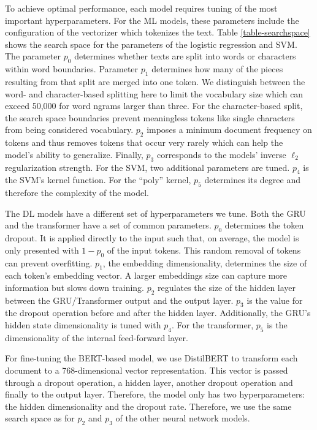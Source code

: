 

To achieve optimal performance, each model requires tuning of the most important hyperparameters. For the ML models, these parameters include the configuration of the vectorizer which tokenizes the text. Table \ref{table-searchspace} shows the search space for the parameters of the logistic regression and SVM. The parameter $p_0$ determines whether texts are split into words or characters within word boundaries. Parameter $p_1$ determines how many of the pieces resulting from that split are merged into one token. We distinguish between the word- and character-based splitting here to limit the vocabulary size which can exceed 50,000 for word ngrams larger than three. For the character-based split, the search space boundaries prevent meaningless tokens like single characters from being considered vocabulary. $p_2$ imposes a minimum document frequency on tokens and thus removes tokens that occur very rarely which can help the model's ability to generalize. Finally, $p_3$ corresponds to the models' inverse $\ell_2$ regularization strength. For the SVM, two additional parameters are tuned. $p_4$ is the SVM's kernel function. For the ``poly'' kernel, $p_5$ determines its degree and therefore the complexity of the model.



The DL models have a different set of hyperparameters we tune. Both the GRU and the transformer have a set of common parameters. $p_0$ determines the token dropout. It is applied directly to the input such that, on average, the model is only presented with $1 - p_0$ of the input tokens. This random removal of tokens can prevent overfitting. $p_1$, the embedding dimensionality, determines the size of each token's embedding vector. A larger embeddings size can capture more information but slows down training. $p_2$ regulates the size of the hidden layer between the GRU/Transformer output and the output layer. $p_3$ is the value for the dropout operation before and after the hidden layer. Additionally, the GRU's hidden state dimensionality is tuned with $p_4$. For the transformer, $p_5$ is the dimensionality of the internal feed-forward layer.



For fine-tuning the BERT-based model, we use DistilBERT  to transform each document to a 768-dimensional vector representation. This vector is passed through a dropout operation, a hidden layer, another dropout operation and finally to the output layer. Therefore, the model only has two hyperparameters: the hidden dimensionality and the dropout rate. Therefore, we use the same search space as for $p_2$ and $p_3$ of the other neural network models.

